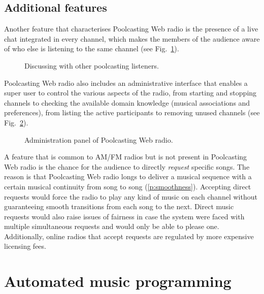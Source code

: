 \subsection{Additional features} %
\label{sub:additional_features}

Another feature that characterises Poolcasting Web radio is the presence of a live chat integrated in every channel, which makes the members of the audience aware of who else is listening to the same channel (see Fig.~\ref{fig:chat}).
%
\begin{figure}[bthp]
\centering \setlength{\abovecaptionskip}{3pt}
\caption{Discussing with other poolcasting listeners.}
\label{fig:chat}
\end{figure}

Poolcasting Web radio also includes an administrative interface that enables a super user to control the various aspects of the radio, from starting and stopping channels to checking the available domain knowledge (musical associations and preferences), from listing the active participants to removing unused channels (see Fig.~\ref{fig:admin}).
%
\begin{figure}[bthp]
\centering \setlength{\abovecaptionskip}{3pt}
\caption{Administration panel of Poolcasting Web radio.}
\label{fig:admin}
\end{figure}

A feature that is common to AM/FM radios but is not present in Poolcasting Web radio is the chance for the audience to directly \emph{request} specific songs.
The reason is that Poolcasting Web radio longs to deliver a musical sequence with a certain musical continuity from song to song (\ref{p:smoothness}).
Accepting direct requests would force the radio to play any kind of music on each channel without guaranteeing smooth transitions from each song to the next.
Direct music requests would also raise issues of fairness in case the system were faced with multiple simultaneous requests and would only be able to please one.
Additionally, online radios that accept requests are regulated by more expensive licensing fees. %




\section{Automated music programming} %
\label{sub:the_reuse_process4}

